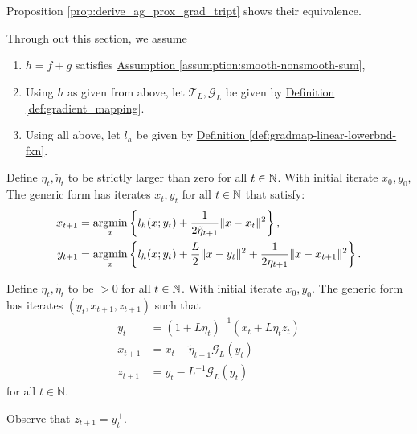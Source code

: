 \documentclass[12pt]{article}
\begin{document}
    {Proposition \ref*{prop:derive_ag_prox_grad_tript}} 
    shows their equivalence. 
    \par
    Through out this section, we assume 
    \begin{enumerate}
        \item $h=f + g$ satisfies 
            \hyperref[assumption:smooth-nonsmooth-sum]
            {Assumption \ref*{assumption:smooth-nonsmooth-sum}}, 
        \item Using $h$ as given from above, let $\mathcal T_L, \mathcal G_L$ be given by 
            \hyperref[def:gradient_mapping]
            {Definition \ref*{def:gradient_mapping}}. 
        \item Using all above, let $l_h$ be given by 
            \hyperref[def:gradmap-linear-lowerbnd-fxn]
            {Definition \ref*{def:gradmap-linear-lowerbnd-fxn}}. 
    \end{enumerate}

    \begin{definition}
    \label{def:ag_prox_grad_ppm}
        Define $\eta_t, \tilde \eta_t$ to be strictly larger than zero for all $t \in \mathbb N$. 
        With initial iterate $x_0, y_0$, 
        The generic form has iterates $x_t, y_t$ for all $t \in \mathbb N$ that satisfy: 
        $$
        \begin{aligned}
            x_{t + 1} &= \mathop{\rm argmin}\limits_{x} \left\lbrace
                l_h(x; y_t) + \frac{1}{2\tilde \eta_{t + 1}} 
                \Vert x - x_t\Vert^2
            \right\rbrace,
            \\
            y_{t + 1}&= 
            \mathop{\rm argmin}\limits_{x}
            \left\lbrace
                l_h(x; y_t) + \frac{L}{2}\Vert x - y_t\Vert^2 + 
                \frac{1}{2\eta_{t + 1}} \Vert x - x_{t + 1}\Vert^2
            \right\rbrace.
        \end{aligned}
        $$
    \end{definition}

    \begin{definition}
    \label{def:ag_prox_grad_generic}
        Define $\eta_t, \tilde \eta_t$ to be $> 0$ for all $t \in \mathbb N$. 
        With initial iterate $x_0, y_0$.
        The generic form has iterates $(y_t, x_{t + 1}, z_{t + 1})$ such that 
        $$
        \begin{aligned}
            y_t &= (1 + L\eta_t)^{-1}(x_t + L\eta_t z_t)
            \\
            x_{t + 1} &= x_t - \tilde \eta_{t + 1} \mathcal G_L(y_t)
            \\
            z_{t + 1} &= y_t - L^{-1}\mathcal G_L(y_t)
        \end{aligned}
        $$
        for all $t\in \mathbb N$. 
    \end{definition}
    \begin{remark}
        Observe that $z_{t + 1} = y_t^+$. 
    \end{remark}
    
\end{document}
